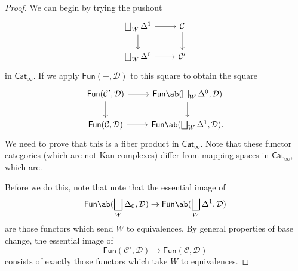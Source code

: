 \documentclass[10pt, oneside]{memoir}
\theoremstyle{definition}
\theoremstyle{remark}
\theoremstyle{plain}
\theoremstyle{definition}
\theoremstyle{remark}
\newcommand{\mc}[1]{\mathcal{#1}}
\newcommand{\ms}[1]{\mathsf{#1}}
\newcommand{\1}{\mathbf{1}}
\newcommand{\2}{\mathbf{2}}
\newcommand{\3}{\mathbf{3}}
\begin{document}
\begin{proof}
    We can begin by trying the pushout
    \begin{equation*}
    \begin{tikzcd}
        \bigsqcup_W \Delta^1 \ar{r} \ar{d} & \mc{C} \ar{d} \\
        \bigsqcup_W \Delta^0 \ar{r} & \mc{C}'
    \end{tikzcd}
    \end{equation*}
    in $\ms{Cat}_{\infty}$. If we apply $\ms{Fun}(-, \mc{D})$ to this square to obtain the square
    \begin{equation*}
    \begin{tikzcd}
        \ms{Fun}(\mc{C}', \mc{D}) \ar{r} \ar{d} & \ms{Fun}\ab(\bigsqcup_W \Delta^0, \mc{D}) \ar{d} \\
        \ms{Fun}(\mc{C}, \mc{D}) \ar{r} & \ms{Fun}\ab(\bigsqcup_W \Delta^1, \mc{D}).
    \end{tikzcd}
    \end{equation*}
    We need to prove that this is a fiber product in $\ms{Cat}_{\infty}$. Note that these functor categories (which are not Kan complexes) differ from mapping spaces in $\ms{Cat}_{\infty}$, which are.

    Before we do this, note that note that the essential image of
    \[ \ms{Fun}\ab(\bigsqcup_W \Delta_0, \mc{D}) \to \ms{Fun}\ab(\bigsqcup_{W} \Delta^1, \mc{D}) \]
    are those functors which send $W$ to equivalences. By general properties of base change, the essential image of
    \[ \ms{Fun}(\mc{C}', \mc{D}) \to \ms{Fun}(\mc{C}, \mc{D}) \]
    consists of exactly those functors which take $W$ to equivalences.


\end{proof}
\end{document}
